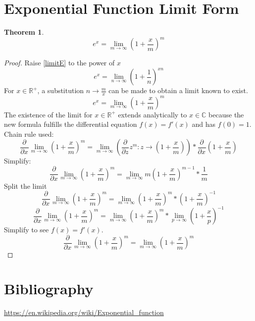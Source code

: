 \documentclass[]{article}
\newcommand{\pqty}[1]{{\left(#1\right)}}
\newcommand{\pdiff}[2]{\frac{\partial^{#2}}{\partial #1^{#2}}}
\newtheorem{theorem}{Theorem}[section]
\numberwithin{equation}{section}
\begin{document}
	\section{Exponential Function Limit Form}
	\begin{theorem}
		\begin{equation}
			\label{expLim2}
			e^x=\lim\limits_{m\to\infty}\pqty{1+\frac{x}{m}}^m
		\end{equation}
	\end{theorem}
	\begin{proof}
		Raise \eqref{limitE} to the power of \(x\)
		\begin{equation}
			e^x=\lim\limits_{n\to\infty}\pqty{1+\frac{1}{n}}^{xn}
		\end{equation}
		For \(x\in\mathbb{R}^+\), a substitution \(n\to \frac{m}{x}\) can be made to obtain a limit known to exist.
		\begin{equation}
			e^x=\lim\limits_{m\to\infty}\pqty{1+\frac{x}{m}}^m
		\end{equation}
		The existence of the limit for \(x\in\mathbb{R}^+\) extends analytically to \(x\in\mathbb{C}\) because the new formula fulfills the differential equation \(f(x)=f'(x)\) and has \(f(0)=1\).
		Chain rule used:
		\begin{equation}
		\pdiff{x}{}\lim\limits_{m\to\infty}\pqty{1+\frac{x}{m}}^m
		=
		\lim\limits_{m\to\infty}\pqty{\pdiff{z}{}z^m:z\to \pqty{1+\frac{x}{m}}}*\pdiff{x}{}\pqty{1+\frac{x}{m}}
		\end{equation}
		Simplify:
		\begin{equation}
		\pdiff{x}{}\lim\limits_{m\to\infty}\pqty{1+\frac{x}{m}}^m
		=
		\lim\limits_{m\to\infty}m\pqty{1+\frac{x}{m}}^{m-1}*\frac{1}{m}
		\end{equation}
		Split the limit
		\begin{equation}
		\pdiff{x}{}\lim\limits_{m\to\infty}\pqty{1+\frac{x}{m}}^m
		=
		\lim\limits_{m\to\infty}\pqty{1+\frac{x}{m}}^{m}*\pqty{1+\frac{x}{m}}^{-1}
		\end{equation}
		\begin{equation}
		\pdiff{x}{}\lim\limits_{m\to\infty}\pqty{1+\frac{x}{m}}^m
		=
		\lim\limits_{m\to\infty}\pqty{1+\frac{x}{m}}^{m}*
		\lim\limits_{p\to\infty}\pqty{1+\frac{x}{p}}^{-1}
		\end{equation}
		Simplify to see \(f(x)=f'(x)\).
		\begin{equation}
		\pdiff{x}{}\lim\limits_{m\to\infty}\pqty{1+\frac{x}{m}}^m
		=
		\lim\limits_{m\to\infty}\pqty{1+\frac{x}{m}}^{m}
		\end{equation}
	\end{proof}
	
	
	
	
	\section{Bibliography}
	\url{https://en.wikipedia.org/wiki/Exponential_function}
	
\end{document}
